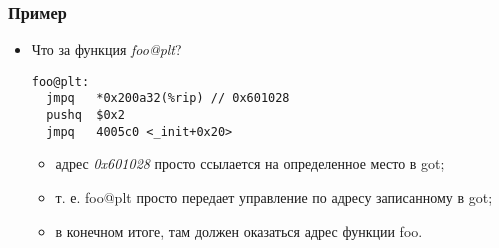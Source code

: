 \begin{frame}[fragile]
\frametitle{Пример}
\begin{itemize}
  \item Что за функция \emph{foo@plt}?
\begin{lstlisting}
foo@plt:
  jmpq   *0x200a32(%rip) // 0x601028
  pushq  $0x2
  jmpq   4005c0 <_init+0x20>
\end{lstlisting}
  \begin{itemize}
    \item адрес \emph{0x601028} просто ссылается на определенное место в got;
    \item т. е. foo@plt просто передает управление по адресу записанному в got;
    \item в конечном итоге, там должен оказаться адрес функции foo.
  \end{itemize}
\end{itemize}
\end{frame}
